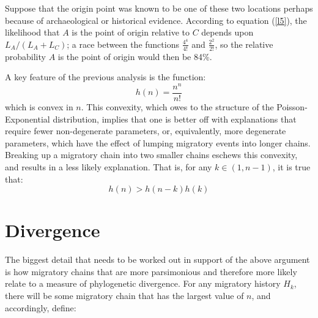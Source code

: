 \documentclass[11pt]{article}
\begin{document}
Suppose that the origin point was known to be one of these two locations perhaps because of archaeological or historical evidence. According to equation (\ref{l5}), the likelihood that $A$ is the point of origin relative to $C$ depends upon $L_{A} /(L_A+L_C)$; a race between the functions $\frac{4^4}{4!}$ and $\frac{2^2}{2!}$, so the relative probability  $A$ is the point of origin would then be 84\%. 

A key feature of the previous analysis is the function: 
\begin{equation*}
h(n)=\frac{n^n}{n!}
\end{equation*}
which is convex in $n$. This convexity, which owes to the structure of the Poisson-Exponential distribution, implies that one is better off with explanations that require fewer non-degenerate parameters, or, equivalently, more degenerate parameters, which have the effect of lumping migratory events into longer chains. Breaking up a migratory chain into two smaller chains eschews this convexity, and results in a less likely explanation. That is, for any  $k \in (1,n-1)$, it is true that:
\begin{equation*}
h(n) > h(n-k)h(k)
\end{equation*} 

\section{Divergence}
The biggest detail that needs to be worked out in support of the above argument is how migratory chains that are more parsimonious and therefore more likely relate to a measure of phylogenetic divergence. For any migratory history $H_k$, there will be some migratory chain that has the largest value of $n$, and accordingly, define:
\end{document}
